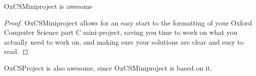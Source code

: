\question
\label{sec:q1}

\subquestion

\begin{claim}
	OxCSMiniproject is awesome

	\begin{proof}

		OxCSMiniproject allows for an easy start to the formatting of your Oxford Computer Science
		part C mini-project, saving you time to work on what you actually need to work on, and
		making sure your solutions are clear and easy to read.
	\end{proof}
\end{claim}

\begin{corollary}

	OxCSProject is also awesome, since OxCSMiniproject is based on it.
\end{corollary}
